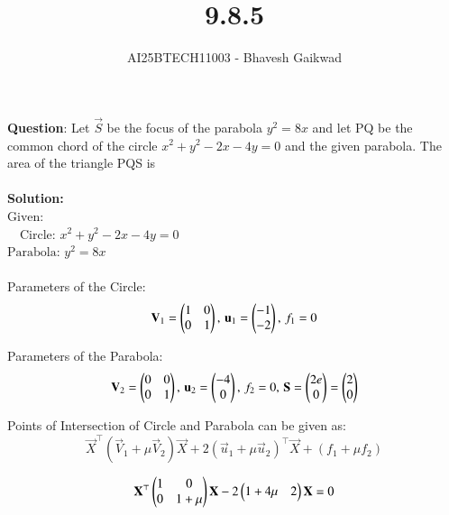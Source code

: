 \documentclass[journal]{IEEEtran}
\begin{document}

\vspace{3cm}

\title{9.8.5}
\author{AI25BTECH11003 - Bhavesh Gaikwad}
{\let\newpage\relax\maketitle}

\renewcommand{\thefigure}{\theenumi}
\renewcommand{\thetable}{\theenumi}
\setlength{\intextsep}{10pt} 


\renewcommand{\thetable}{\theenumi}


\textbf{Question}: Let $\vec{S}$ be the focus of the parabola $y^2 = 8x$ and let PQ be the common chord of the circle $x^2 + y^2 - 2x - 4y = 0$ and the given parabola. The area of the triangle PQS is\\\\

\textbf{Solution:}\\
  $\text{Given: }$\\
$\quad \text{Circle: }x^2 + y^2 - 2x - 4y = 0$\\
$\text{Parabola: }y^2 = 8x$\\\\


Parameters of the Circle:
\begin{equation}
\mathbf{V}_1 = \begin{pmatrix}1 & 0 \\ 0 & 1\end{pmatrix}, \, \mathbf{u}_1 = \begin{pmatrix}-1 \\ -2\end{pmatrix}, \, f_1 = 0   
\end{equation}

Parameters of the Parabola:
\begin{equation}
\mathbf{V}_2 = \begin{pmatrix}0 & 0 \\ 0 & 1\end{pmatrix}, \, \mathbf{u}_2 = \begin{pmatrix}-4 \\ 0\end{pmatrix}, \, f_2 = 0, \, \mathbf{S} = \begin{pmatrix}2e \\ 0 \end{pmatrix} = \begin{pmatrix}2 \\ 0\end{pmatrix}   
\end{equation}

Points of Intersection of Circle and Parabola can be given as:
\begin{equation}
\vec{X}^\top(\vec{V}_1+\mu\vec{V}_2)\vec{X} + 2(\vec{u}_1+\mu\vec{u}_2)^\top\vec{X} + (f_1 + \mu f_2)    
\end{equation}

\begin{equation}
\mathbf{X}^\top\begin{pmatrix}1 & 0 \\ 0 & 1+\mu\end{pmatrix}\mathbf{X} - 2\begin{pmatrix}1+4\mu & 2\end{pmatrix}\mathbf{X} = 0    
\end{equation}
\end{document}
